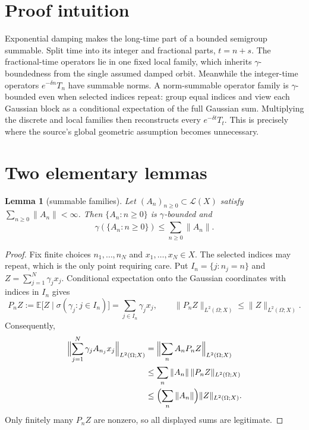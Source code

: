 \documentclass[11pt]{article}
\newtheorem{lemma}[theorem]{Lemma}
\newcommand{\cL}{\mathcal L}
\begin{document}
\section{Proof intuition}

Exponential damping makes the long-time part of a bounded semigroup
summable.  Split time into its integer and fractional parts, $t=n+s$.  The
fractional-time operators lie in one fixed local family, which inherits
$\gamma$-boundedness from the single assumed damped orbit.  Meanwhile the
integer-time operators $e^{-\delta n}T_n$ have summable norms.  A
norm-summable operator family is $\gamma$-bounded even when selected indices
repeat: group equal indices and view each Gaussian block as a conditional
expectation of the full Gaussian sum.  Multiplying the discrete and local
families then reconstructs every $e^{-\delta t}T_t$.  This is precisely where
the source's global geometric assumption becomes unnecessary.

\section{Two elementary lemmas}

\begin{lemma}[summable families]\label{lem:summable}
Let $(A_n)_{n\geq0}\subset\cL(X)$ satisfy
$\sum_{n\geq0}\|A_n\|<\infty$.  Then $\{A_n:n\geq0\}$ is
$\gamma$-bounded and
\[
 \gamma(\{A_n:n\geq0\})\leq\sum_{n\geq0}\|A_n\|.
\]
\end{lemma}

\begin{proof}
Fix finite choices $n_1,\dots,n_N$ and $x_1,\dots,x_N\in X$.  The selected
indices may repeat, which is the only point requiring care.  Put
$I_n=\{j:n_j=n\}$ and
$Z=\sum_{j=1}^N\gamma_jx_j$.  Conditional expectation onto the Gaussian
coordinates with indices in $I_n$ gives
\[
 P_nZ:=\mathbb E\bigl[Z\mid\sigma(\gamma_j:j\in I_n)\bigr]
      =\sum_{j\in I_n}\gamma_jx_j,
 \qquad \|P_nZ\|_{L^2(\Omega;X)}\leq\|Z\|_{L^2(\Omega;X)}.
\]
Consequently,
\begin{align*}
 \Bigl\|\sum_{j=1}^N\gamma_jA_{n_j}x_j\Bigr\|_{L^2(\Omega;X)}
 &=\Bigl\|\sum_{n}A_nP_nZ\Bigr\|_{L^2(\Omega;X)}\\
 &\leq\sum_n\|A_n\|\,\|P_nZ\|_{L^2(\Omega;X)}\\
 &\leq\Bigl(\sum_n\|A_n\|\Bigr)\|Z\|_{L^2(\Omega;X)}.
\end{align*}
Only finitely many $P_nZ$ are nonzero, so all displayed sums are legitimate.
\end{proof}
\end{document}
